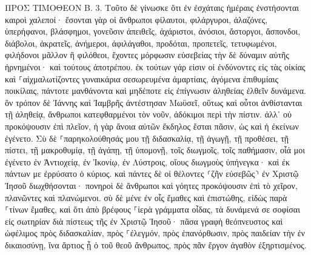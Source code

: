 \documentclass[twoside, 9pt]{extreport}
\begin{document}
ΠΡΟΣ ΤΙΜΟΘΕΟΝ Β.
3.
Τοῦτο δὲ γίνωσκε ὅτι ἐν ἐσχάταις ἡμέραις ἐνστήσονται καιροὶ χαλεποί· 
ἔσονται γὰρ οἱ ἄνθρωποι φίλαυτοι, φιλάργυροι, ἀλαζόνες, ὑπερήφανοι, βλάσφημοι, γονεῦσιν ἀπειθεῖς, ἀχάριστοι, ἀνόσιοι, 
ἄστοργοι, ἄσπονδοι, διάβολοι, ἀκρατεῖς, ἀνήμεροι, ἀφιλάγαθοι, 
προδόται, προπετεῖς, τετυφωμένοι, φιλήδονοι μᾶλλον ἢ φιλόθεοι, 
ἔχοντες μόρφωσιν εὐσεβείας τὴν δὲ δύναμιν αὐτῆς ἠρνημένοι· καὶ τούτους ἀποτρέπου. 
ἐκ τούτων γάρ εἰσιν οἱ ἐνδύνοντες εἰς τὰς οἰκίας καὶ ⸀αἰχμαλωτίζοντες γυναικάρια σεσωρευμένα ἁμαρτίαις, ἀγόμενα ἐπιθυμίαις ποικίλαις, 
πάντοτε μανθάνοντα καὶ μηδέποτε εἰς ἐπίγνωσιν ἀληθείας ἐλθεῖν δυνάμενα. 
ὃν τρόπον δὲ Ἰάννης καὶ Ἰαμβρῆς ἀντέστησαν Μωϋσεῖ, οὕτως καὶ οὗτοι ἀνθίστανται τῇ ἀληθείᾳ, ἄνθρωποι κατεφθαρμένοι τὸν νοῦν, ἀδόκιμοι περὶ τὴν πίστιν. 
ἀλλ᾽ οὐ προκόψουσιν ἐπὶ πλεῖον, ἡ γὰρ ἄνοια αὐτῶν ἔκδηλος ἔσται πᾶσιν, ὡς καὶ ἡ ἐκείνων ἐγένετο. 
Σὺ δὲ ⸀παρηκολούθησάς μου τῇ διδασκαλίᾳ, τῇ ἀγωγῇ, τῇ προθέσει, τῇ πίστει, τῇ μακροθυμίᾳ, τῇ ἀγάπῃ, τῇ ὑπομονῇ, 
τοῖς διωγμοῖς, τοῖς παθήμασιν, οἷά μοι ἐγένετο ἐν Ἀντιοχείᾳ, ἐν Ἰκονίῳ, ἐν Λύστροις, οἵους διωγμοὺς ὑπήνεγκα· καὶ ἐκ πάντων με ἐρρύσατο ὁ κύριος. 
καὶ πάντες δὲ οἱ θέλοντες ⸂ζῆν εὐσεβῶς⸃ ἐν Χριστῷ Ἰησοῦ διωχθήσονται· 
πονηροὶ δὲ ἄνθρωποι καὶ γόητες προκόψουσιν ἐπὶ τὸ χεῖρον, πλανῶντες καὶ πλανώμενοι. 
σὺ δὲ μένε ἐν οἷς ἔμαθες καὶ ἐπιστώθης, εἰδὼς παρὰ ⸀τίνων ἔμαθες, 
καὶ ὅτι ἀπὸ βρέφους ⸀ἱερὰ γράμματα οἶδας, τὰ δυνάμενά σε σοφίσαι εἰς σωτηρίαν διὰ πίστεως τῆς ἐν Χριστῷ Ἰησοῦ· 
πᾶσα γραφὴ θεόπνευστος καὶ ὠφέλιμος πρὸς διδασκαλίαν, πρὸς ⸀ἐλεγμόν, πρὸς ἐπανόρθωσιν, πρὸς παιδείαν τὴν ἐν δικαιοσύνῃ, 
ἵνα ἄρτιος ᾖ ὁ τοῦ θεοῦ ἄνθρωπος, πρὸς πᾶν ἔργον ἀγαθὸν ἐξηρτισμένος. 
\end{document}
